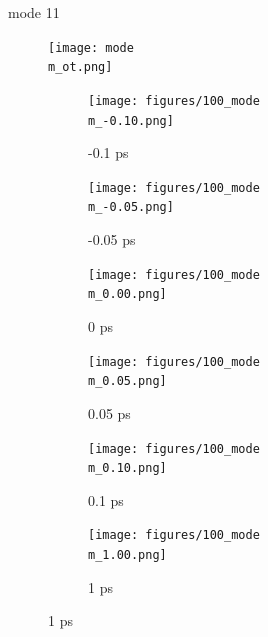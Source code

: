 \documentclass{beamer}
\newcommand\w{0.32}
\begin{document}
\renewcommand\m{11}
\begin{frame}{mode \m}
		\vspace{\vh mm}
	\begin{figure}
		\centering
		\texttt{[image: mode\\m\_ot.png]}
	\end{figure}
	\begin{figure}
		\centering
		\begin{subfigure}[b]{\w\textwidth}
			\centering
			\texttt{[image: figures/100\_mode\\m\_-0.10.png]}
			\caption{-0.1 ps}
		\end{subfigure}
		\begin{subfigure}[b]{\w\textwidth}
			\centering
			\texttt{[image: figures/100\_mode\\m\_-0.05.png]}
			\caption{-0.05 ps}
		\end{subfigure}
		\begin{subfigure}[b]{\w\textwidth}
			\centering
			\texttt{[image: figures/100\_mode\\m\_0.00.png]}
			\caption{0 ps}
		\end{subfigure}
		\begin{subfigure}[b]{\w\textwidth}
			\centering
			\texttt{[image: figures/100\_mode\\m\_0.05.png]}
			\caption{0.05 ps}
		\end{subfigure}
		\begin{subfigure}[b]{\w\textwidth}
			\centering
			\texttt{[image: figures/100\_mode\\m\_0.10.png]}
			\caption{0.1 ps}
		\end{subfigure}
		\begin{subfigure}[b]{\w\textwidth}
			\centering
			\texttt{[image: figures/100\_mode\\m\_1.00.png]}
			\caption{1 ps}
		\end{subfigure}
	\end{figure}
\end{frame}
\end{document}

